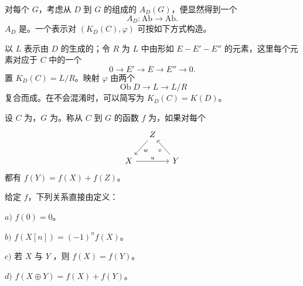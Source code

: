 对每个 $G$，考虑从 $D$ 到 $G$ 的组成的 $A_D(G)$，便显然得到一个
\[
A_D:\mathrm{Ab}\longrightarrow\mathrm{Ab}.
\]
 $A_D$ 是。一个表示对 $(K_D(C),\varphi)$ 可按如下方式构造。

以 $L$ 表示由 $D$ 的生成的；令 $R$ 为 $L$ 中由形如 $E-E'-E''$ 的元素，这里每个元素对应于 $C$ 中的一个
\[
0\longrightarrow E'\longrightarrow E\longrightarrow E''\longrightarrow0.
\]
置 $K_D(C)=L/R$。映射 $\varphi$ 由两个
\[
\operatorname{Ob}D\longrightarrow L\longrightarrow L/R
\]
复合而成。在不会混淆时，可以简写为 $K_D(C)=K(D)$。

设 $C$ 为，$G$ 为。称从 $C$ 到 $G$ 的函数 $f$ 为，如果对每个
\[
\begin{tikzcd}[column sep=small]
& Z\arrow[dl,"w"] &\\
X\arrow[rr,"u"] &&Y\arrow[ul,"v"]
\end{tikzcd}
\]
都有 $f(Y)=f(X)+f(Z)$。

给定 $f$，下列关系直接由定义：

$a)$ $f(0)=0$。

$b)$ $f(X[n])=(-1)^nf(X)$。

$c)$ 若 $X$ 与 $Y$ ，则 $f(X)=f(Y)$。

$d)$ $f(X\oplus Y)=f(X)+f(Y)$。

